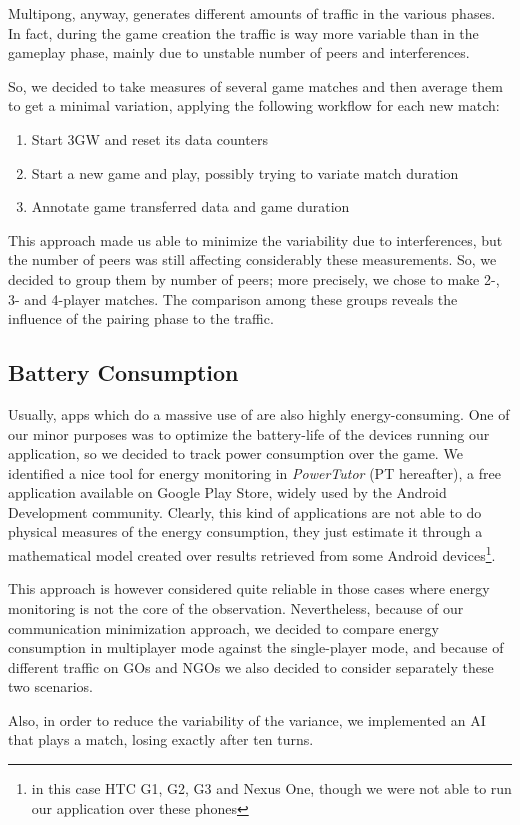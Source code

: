 Multipong, anyway, generates different amounts of traffic in the various
phases. In fact, during the game creation the traffic is way more variable than
in the gameplay phase, mainly due to unstable number of peers and \wifi{}
interferences.

So, we decided to take measures of several game matches and then average them to get a minimal variation, applying the following workflow for each new match:

\begin{enumerate} %
  \item Start 3GW and reset its data counters
  \item Start a new game and play, possibly trying to variate match duration
  \item Annotate game transferred data and game duration
\end{enumerate}

This approach made us able to minimize the variability due to interferences, but the number of peers was still affecting considerably these measurements. So, we decided to group them by number of peers; more precisely, we chose to make 2-, 3- and 4-player matches. The comparison among these groups reveals the influence of the pairing phase to the traffic.

\subsection{Battery Consumption}

Usually, apps which do a massive use of \wifi{} are also highly energy-consuming. One of our minor purposes was to optimize the battery-life of the devices running our application, so we decided to track power consumption over the game. We identified a nice tool for energy monitoring in \textit{PowerTutor} (PT hereafter), a free application available on Google Play Store, widely used by the Android Development community. Clearly, this kind of applications are not able to do physical measures of the energy consumption, they just estimate it through a mathematical model created over results retrieved from some Android devices\footnote{in this case HTC G1, G2, G3 and Nexus One, though we were not able to run our application over these phones}.

This approach is however considered quite reliable in those cases where energy monitoring is not the core of the observation. Nevertheless, because of our communication minimization approach, we decided to compare energy consumption in multiplayer mode against the single-player mode, and because of different traffic on GOs and NGOs we also decided to consider separately these two scenarios.

Also, in order to reduce the variability of the variance, we implemented an AI
that plays a match, losing exactly after ten turns.
